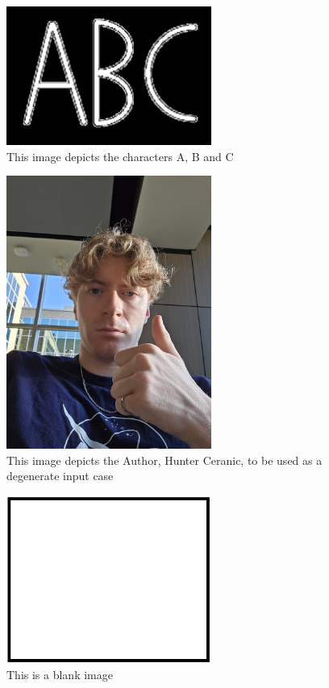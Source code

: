 \documentclass[12pt, titlepage]{article}
\begin{document}
\begin{figure}[h!]
  \begin{center}
    \includegraphics[width=0.6\textwidth]{ABC}
  \caption{This image depicts the characters A, B and C}
  \label{Fig_ABC} 
  \end{center}
  \end{figure}

\begin{figure}[h!]
  \begin{center}
    \includegraphics[width=0.6\textwidth]{hunter}
  \caption{This image depicts the Author, Hunter Ceranic, to be used as a degenerate input case}
  \label{hunter} 
  \end{center}
  \end{figure}

\begin{figure}[h!]
  \begin{center}
    \includegraphics[width=0.6\textwidth]{Blank}
  \caption{This is a blank image}
  \label{Fig_blank} 
  \end{center}
  \end{figure}
\end{document}
